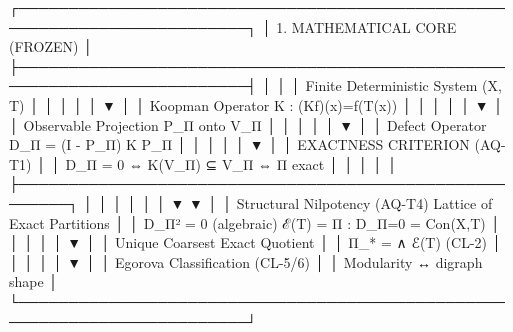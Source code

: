 {{{{{{{{{{{{{┌─────────────────────────────────────────────────────────────────────────┐
│                          1. MATHEMATICAL CORE (FROZEN)                  │
├─────────────────────────────────────────────────────────────────────────┤
│                                                                         │
│   Finite Deterministic System (X, T)                                    │
│              │                                                         │
│              ▼                                                         │
│   Koopman Operator K : (Kf)(x)=f(T(x))                                 │
│              │                                                         │
│              ▼                                                         │
│   Observable Projection P_Π onto V_Π                                   │
│              │                                                         │
│              ▼                                                         │
│   Defect Operator D_Π = (I - P_Π) K P_Π                               │
│              │                                                         │
│              ▼                                                         │
│   EXACTNESS CRITERION (AQ-T1)                                          │
│   D_Π = 0  ⇔  K(V_Π) ⊆ V_Π  ⇔  Π exact                                │
│              │                                                         │
│              ├───────────────────────────────────────────────────────┐ │
│              │                                                       │ │
│              ▼                                                       ▼ │
│   Structural Nilpotency (AQ-T4)             Lattice of Exact Partitions │
│   D_Π² = 0  (algebraic)                   ℰ(T) = {Π : D_Π=0} = Con(X,T) │
│                                                    │                   │
│                                                    ▼                   │
│                                        Unique Coarsest Exact Quotient  │
│                                        Π_* = ∧ ℰ(T)  (CL-2)            │
│                                                    │                   │
│                                                    ▼                   │
│                                        Egorova Classification (CL-5/6) │
│                                        Modularity ↔ digraph shape      │
└─────────────────────────────────────────────────────────────────────────┘

}}}}}}}}}}}}}

